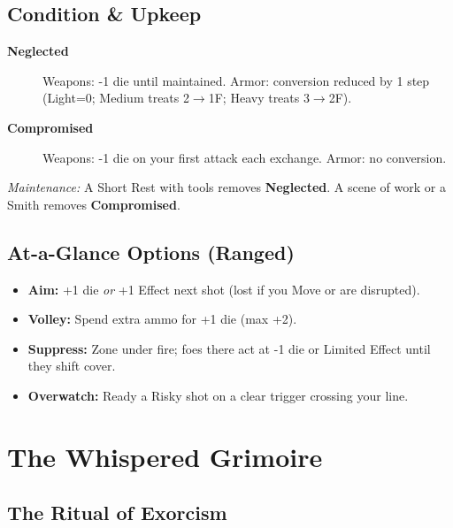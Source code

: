 \section{Condition \& Upkeep}
\label{app:condition}
\begin{description}
  \item[\textbf{Neglected}] Weapons: -1 die until maintained. Armor: conversion reduced by 1 step (Light=0; Medium treats 2$\rightarrow$1F; Heavy treats 3$\rightarrow$2F).
  \item[\textbf{Compromised}] Weapons: -1 die on your first attack each exchange. Armor: no conversion.
\end{description}
\noindent\emph{Maintenance:} A Short Rest with tools removes \textbf{Neglected}. A scene of work or a Smith removes \textbf{Compromised}.

\section{At-a-Glance Options (Ranged)}
\label{app:ranged-at-a-glance}
\begin{itemize}
  \item \textbf{Aim:} +1 die \emph{or} +1 Effect next shot (lost if you Move or are disrupted).
  \item \textbf{Volley:} Spend extra ammo for +1 die (max +2).
  \item \textbf{Suppress:} Zone under fire; foes there act at -1 die or Limited Effect until they shift cover.
  \item \textbf{Overwatch:} Ready a Risky shot on a clear trigger crossing your line.
\end{itemize}


\clearpage

\chapter*{The Whispered Grimoire}

\section*{The Ritual of Exorcism}

